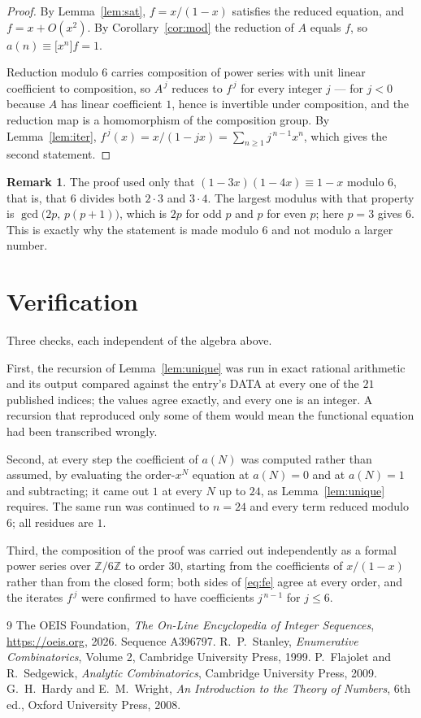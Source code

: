 \documentclass[11pt,a4paper]{article}
\theoremstyle{plain}
\theoremstyle{definition}
\newtheorem{remark}[theorem]{Remark}
\begin{document}
\begin{proof}
By Lemma~\ref{lem:sat}, $f=x/(1-x)$ satisfies the reduced equation, and $f=x+O(x^{2})$.
By Corollary~\ref{cor:mod} the reduction of $A$ equals $f$, so
$a(n)\equiv\bigl[x^{n}\bigr]f=1$.

Reduction modulo $6$ carries composition of power series with unit linear coefficient to
composition, so $A^{\,j}$ reduces to $f^{\,j}$ for every integer $j$ --- for $j<0$
because $A$ has linear coefficient $1$, hence is invertible under composition, and the
reduction map is a homomorphism of the composition group. By Lemma~\ref{lem:iter},
$f^{\,j}(x)=x/(1-jx)=\sum_{n\ge1}j^{\,n-1}x^{n}$, which gives the second statement.
\end{proof}

\begin{remark}
The proof used only that $(1-3x)(1-4x)\equiv1-x$ modulo $6$, that is, that
$6$ divides both $2\cdot3$ and $3\cdot4$. The largest modulus with that property
is $\gcd\bigl(2p,\,p(p+1)\bigr)$, which is $2p$ for odd $p$ and $p$ for even $p$; here
$p=3$ gives $6$. This is exactly why the statement is made modulo $6$ and not modulo
a larger number.
\end{remark}


\section{Verification}

Three checks, each independent of the algebra above.

First, the recursion of Lemma~\ref{lem:unique} was run in exact rational arithmetic and
its output compared against the entry's DATA at every one of the $21$ published
indices; the values agree exactly, and every one is an integer. A recursion that reproduced
only some of them would mean the functional equation had been transcribed wrongly.

Second, at every step the coefficient of $a(N)$ was computed rather than assumed, by
evaluating the order-$x^{N}$ equation at $a(N)=0$ and at $a(N)=1$ and subtracting; it came
out $1$ at every $N$ up to $24$, as Lemma~\ref{lem:unique} requires. The same run was
continued to $n=24$ and every term reduced modulo $6$; all residues are
$1$.

Third, the composition of the proof was carried out independently as a formal power series
over $\mathbb{Z}/6\mathbb{Z}$ to order $30$, starting from the coefficients of $x/(1-x)$
rather than from the closed form; both sides of \eqref{eq:fe} agree at every order, and the
iterates $f^{\,j}$ were confirmed to have coefficients $j^{\,n-1}$ for $j\le6$.

\begin{thebibliography}{9}
 The OEIS Foundation, \emph{The On-Line Encyclopedia of Integer
Sequences}, \url{https://oeis.org}, 2026. Sequence A396797.
 R.~P.~Stanley, \emph{Enumerative Combinatorics}, Volume 2, Cambridge
University Press, 1999.
 P.~Flajolet and R.~Sedgewick, \emph{Analytic Combinatorics}, Cambridge
University Press, 2009.
 G.~H.~Hardy and E.~M.~Wright, \emph{An Introduction to the Theory of
Numbers}, 6th ed., Oxford University Press, 2008.
\end{thebibliography}
\end{document}
